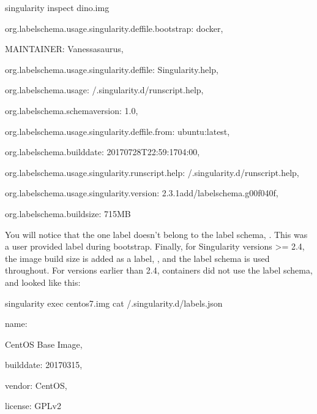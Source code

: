 \documentclass[letterpaper,10pt,english]{sphinxmanual}
\begin{document}
%
\begin{sphinxVerbatim}[commandchars=\\\{\}]
\PYGZdl{} singularity inspect dino.img

\PYGZob{}

    \PYGZdq{}org.label\PYGZhy{}schema.usage.singularity.deffile.bootstrap\PYGZdq{}: \PYGZdq{}docker\PYGZdq{},

    \PYGZdq{}MAINTAINER\PYGZdq{}: \PYGZdq{}Vanessasaurus\PYGZdq{},

    \PYGZdq{}org.label\PYGZhy{}schema.usage.singularity.deffile\PYGZdq{}: \PYGZdq{}Singularity.help\PYGZdq{},

    \PYGZdq{}org.label\PYGZhy{}schema.usage\PYGZdq{}: \PYGZdq{}/.singularity.d/runscript.help\PYGZdq{},

    \PYGZdq{}org.label\PYGZhy{}schema.schema\PYGZhy{}version\PYGZdq{}: \PYGZdq{}1.0\PYGZdq{},

    \PYGZdq{}org.label\PYGZhy{}schema.usage.singularity.deffile.from\PYGZdq{}: \PYGZdq{}ubuntu:latest\PYGZdq{},

    \PYGZdq{}org.label\PYGZhy{}schema.build\PYGZhy{}date\PYGZdq{}: \PYGZdq{}2017\PYGZhy{}07\PYGZhy{}28T22:59:17\PYGZhy{}04:00\PYGZdq{},

    \PYGZdq{}org.label\PYGZhy{}schema.usage.singularity.runscript.help\PYGZdq{}: \PYGZdq{}/.singularity.d/runscript.help\PYGZdq{},

    \PYGZdq{}org.label\PYGZhy{}schema.usage.singularity.version\PYGZdq{}: \PYGZdq{}2.3.1\PYGZhy{}add/label\PYGZhy{}schema.g00f040f\PYGZdq{},

    \PYGZdq{}org.label\PYGZhy{}schema.build\PYGZhy{}size\PYGZdq{}: \PYGZdq{}715MB\PYGZdq{}

\PYGZcb{}
\end{sphinxVerbatim}

You will notice that the one label doesn’t belong to the label schema,  .
This was a user provided label during bootstrap. Finally, for
Singularity versions \textgreater{}= 2.4, the image build size is added as a label, ,
and the label schema is used throughout. For versions earlier than 2.4,
containers did not use the label schema, and looked like this:

%
\begin{sphinxVerbatim}[commandchars=\\\{\}]
singularity exec centos7.img cat /.singularity.d/labels.json

\PYGZob{} \PYGZdq{}name\PYGZdq{}:

      \PYGZdq{}CentOS Base Image\PYGZdq{},

       \PYGZdq{}build\PYGZhy{}date\PYGZdq{}: \PYGZdq{}20170315\PYGZdq{},

       \PYGZdq{}vendor\PYGZdq{}: \PYGZdq{}CentOS\PYGZdq{},

       \PYGZdq{}license\PYGZdq{}: \PYGZdq{}GPLv2\PYGZdq{}

\PYGZcb{}
\end{sphinxVerbatim}
\end{document}
